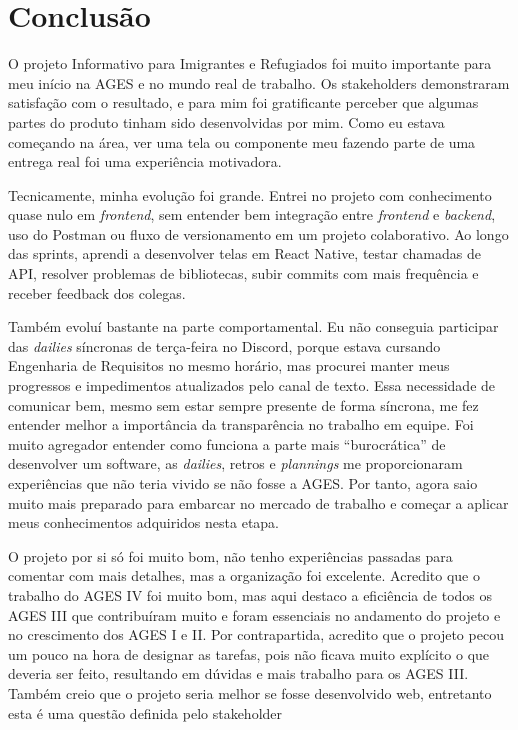 \section[Conclusão]{Conclusão}

O projeto Informativo para Imigrantes e Refugiados foi muito importante para meu início na AGES e no mundo real de trabalho. Os stakeholders demonstraram satisfação com o resultado, e para mim foi gratificante perceber que algumas partes do produto tinham sido desenvolvidas por mim. Como eu estava começando na área, ver uma tela ou componente meu fazendo parte de uma entrega real foi uma experiência motivadora.

Tecnicamente, minha evolução foi grande. Entrei no projeto com conhecimento quase nulo em \textit{frontend}, sem entender bem integração entre \textit{frontend} e \textit{backend}, uso do Postman ou fluxo de versionamento em um projeto colaborativo. Ao longo das sprints, aprendi a desenvolver telas em React Native, testar chamadas de API, resolver problemas de bibliotecas, subir commits com mais frequência e receber feedback dos colegas.

Também evoluí bastante na parte comportamental. Eu não conseguia participar das \textit{dailies} síncronas de terça-feira no Discord, porque estava cursando Engenharia de Requisitos no mesmo horário, mas procurei manter meus progressos e impedimentos atualizados pelo canal de texto. Essa necessidade de comunicar bem, mesmo sem estar sempre presente de forma síncrona, me fez entender melhor a importância da transparência no trabalho em equipe. Foi muito agregador entender como funciona a parte mais “burocrática”
de desenvolver um software, as \textit{dailies}, retros e \textit{plannings} me
proporcionaram experiências que não teria vivido se não fosse a AGES. Por
tanto, agora saio muito mais preparado para embarcar no mercado de
trabalho e começar a aplicar meus conhecimentos adquiridos nesta etapa.

O projeto por si só foi muito bom, não tenho experiências passadas para comentar
com mais detalhes, mas a organização foi excelente. Acredito que o trabalho do
AGES IV foi muito bom, mas aqui destaco a eficiência de todos os AGES III que
contribuíram muito e foram essenciais no andamento do projeto e no crescimento
dos AGES I e II. Por contrapartida, acredito que o projeto pecou um pouco na hora
de designar as tarefas, pois não ficava muito explícito o que deveria ser feito,
resultando em dúvidas e mais trabalho para os AGES III. Também creio que o
projeto seria melhor se fosse desenvolvido web, entretanto esta é uma questão
definida pelo stakeholder
